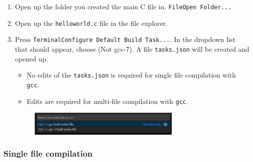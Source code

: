 \begin{enumerate}
    \item Open up the folder you created the main C file in. \texttt{File\ra Open Folder...}
    
    \item Open up the \texttt{helloworld.c} file in the file explorer.
    
    \item Press \texttt{Terminal\ra Configure Default Build Task...}. In the dropdown list that should appear, choose  (Not gcc-7). A file \texttt{tasks.json} will be created and opened up.
    \begin{itemize}
        \item No edits of the \texttt{tasks.json} is required for single file compilation with \texttt{gcc}.
        \item Edits are required for multi-file compilation with \texttt{gcc}.
    \end{itemize}

    \begin{figure}[H]
        \centering
        \includegraphics[width=0.7\textwidth]{figures/vscode_compiler.PNG}
    \end{figure}

\end{enumerate}

\subsubsection{Single file compilation}

